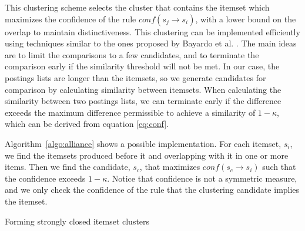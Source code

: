 \documentclass[letterpaper,12pt,titlepage,oneside,final]{book}
\begin{document}
This clustering scheme selects the cluster that contains the itemset which
maximizes the confidence of the rule $conf(s_j \rightarrow s_i)$,
with a lower bound on the overlap to maintain distinctiveness. 
This clustering can be implemented efficiently using techniques similar to
the ones proposed by Bayardo et al. \cite{bayardo2007scaling}.
The main ideas are to limit the comparisons to a few candidates,
and to terminate the comparison early if the similarity threshold will not
be met.
In our case, the postings lists are longer than the itemsets,
so we generate candidates for comparison by calculating similarity between
itemsets.
When calculating the similarity between two postings lists,
we can terminate early if the difference exceeds the maximum difference
permissible to achieve a similarity of $1-\kappa$,
which can be derived from equation \ref{eq:conf}. 

Algorithm~\ref{algo:alliance}  shows a possible implementation.
For each itemset, $s_i$, we find the itemsets produced before it
and overlapping with it in one or more items.
Then we find the candidate, $s_c$, that maximizes
$conf(s_c \rightarrow s_i)$ such that the confidence exceeds $1-\kappa$.
Notice that confidence is not a symmetric measure,
and we only check the confidence of the rule that the clustering candidate
implies the itemset. 


\begin{algorithm}
\SetAlgoLined
\LinesNumbered
{} 
\;
\caption{Forming strongly closed itemset clusters}
\label{algo:alliance}
\end{algorithm}
\end{document}
